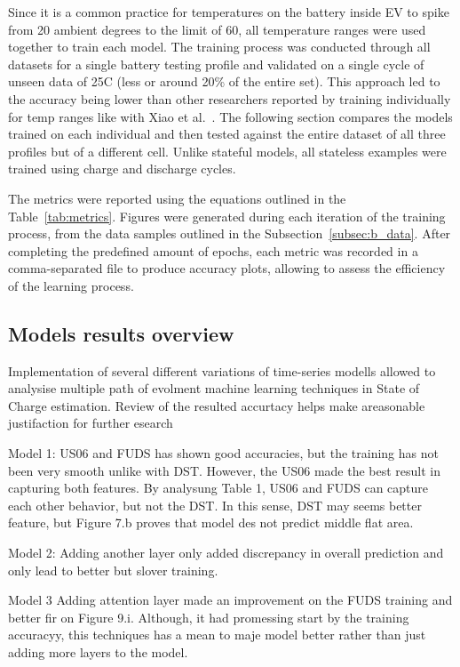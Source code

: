 Since it is a common practice for temperatures on the battery inside EV to spike from 20 ambient degrees to the limit of 60, all temperature ranges were used together to train each model.
The training process was conducted through all datasets for a single battery testing profile and validated on a single cycle of unseen data of 25\textdegree{}C (less or around 20\% of the entire set).
This approach led to the accuracy being lower than other researchers reported by training individually for temp ranges like with Xiao et al.~\cite{xiao_accurate_2019}.
The following section compares the models trained on each individual and then tested against the entire dataset of all three profiles but of a different cell.
Unlike stateful models, all stateless examples were trained using charge and discharge cycles.

%
%
The metrics were reported using the equations outlined in the \mbox{Table~\ref{tab:metrics}}.
Figures were generated during each iteration of the training process, from the data samples outlined in the \mbox{Subsection~\ref{subsec:b_data}}.
After completing the predefined amount of epochs, each metric was recorded in a comma-separated file to produce accuracy plots, allowing to assess the efficiency of the learning process.

%
%
\subsection{Models results overview}
Implementation of several different variations of time-series modells allowed to analysise multiple path of evolment machine learning techniques in State of Charge estimation.
Review of the resulted accurtacy helps make areasonable justifaction for further esearch


Model 1: US06 and FUDS has shown good accuracies, but the training has not been very smooth unlike with DST.
However, the US06 made the best result in capturing both features.
By analysung Table 1, US06 and FUDS can capture each other behavior, but not the DST.
In this sense, DST may seems better feature, but Figure 7.b proves that model des not predict middle flat area.

%
%
Model 2: Adding another layer only added discrepancy in overall prediction and only lead to better but slover training.

%
%
Model 3 Adding attention layer made an improvement on the FUDS training and better fir on Figure 9.i.
Although, it had promessing start by the training accuracyy, this techniques has a mean to maje model better rather than just adding more layers to the model.

